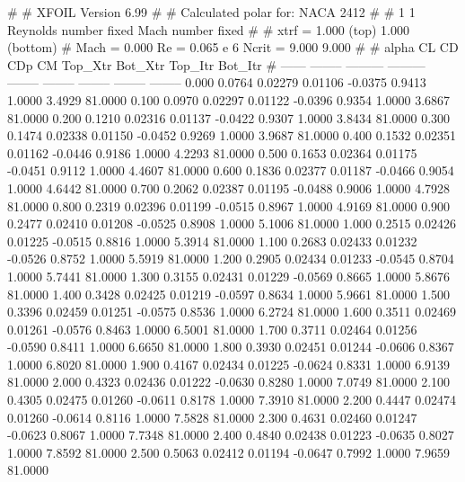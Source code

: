 #  
#       XFOIL         Version 6.99
#  
# Calculated polar for: NACA 2412                                       
#  
# 1 1 Reynolds number fixed          Mach number fixed         
#  
# xtrf =   1.000 (top)        1.000 (bottom)  
# Mach =   0.000     Re =     0.065 e 6     Ncrit =   9.000  9.000
#  
#   alpha    CL        CD       CDp       CM     Top_Xtr  Bot_Xtr  Top_Itr  Bot_Itr
#  ------ -------- --------- --------- -------- -------- -------- -------- --------
   0.000   0.0764   0.02279   0.01106  -0.0375   0.9413   1.0000   3.4929  81.0000
   0.100   0.0970   0.02297   0.01122  -0.0396   0.9354   1.0000   3.6867  81.0000
   0.200   0.1210   0.02316   0.01137  -0.0422   0.9307   1.0000   3.8434  81.0000
   0.300   0.1474   0.02338   0.01150  -0.0452   0.9269   1.0000   3.9687  81.0000
   0.400   0.1532   0.02351   0.01162  -0.0446   0.9186   1.0000   4.2293  81.0000
   0.500   0.1653   0.02364   0.01175  -0.0451   0.9112   1.0000   4.4607  81.0000
   0.600   0.1836   0.02377   0.01187  -0.0466   0.9054   1.0000   4.6442  81.0000
   0.700   0.2062   0.02387   0.01195  -0.0488   0.9006   1.0000   4.7928  81.0000
   0.800   0.2319   0.02396   0.01199  -0.0515   0.8967   1.0000   4.9169  81.0000
   0.900   0.2477   0.02410   0.01208  -0.0525   0.8908   1.0000   5.1006  81.0000
   1.000   0.2515   0.02426   0.01225  -0.0515   0.8816   1.0000   5.3914  81.0000
   1.100   0.2683   0.02433   0.01232  -0.0526   0.8752   1.0000   5.5919  81.0000
   1.200   0.2905   0.02434   0.01233  -0.0545   0.8704   1.0000   5.7441  81.0000
   1.300   0.3155   0.02431   0.01229  -0.0569   0.8665   1.0000   5.8676  81.0000
   1.400   0.3428   0.02425   0.01219  -0.0597   0.8634   1.0000   5.9661  81.0000
   1.500   0.3396   0.02459   0.01251  -0.0575   0.8536   1.0000   6.2724  81.0000
   1.600   0.3511   0.02469   0.01261  -0.0576   0.8463   1.0000   6.5001  81.0000
   1.700   0.3711   0.02464   0.01256  -0.0590   0.8411   1.0000   6.6650  81.0000
   1.800   0.3930   0.02451   0.01244  -0.0606   0.8367   1.0000   6.8020  81.0000
   1.900   0.4167   0.02434   0.01225  -0.0624   0.8331   1.0000   6.9139  81.0000
   2.000   0.4323   0.02436   0.01222  -0.0630   0.8280   1.0000   7.0749  81.0000
   2.100   0.4305   0.02475   0.01260  -0.0611   0.8178   1.0000   7.3910  81.0000
   2.200   0.4447   0.02474   0.01260  -0.0614   0.8116   1.0000   7.5828  81.0000
   2.300   0.4631   0.02460   0.01247  -0.0623   0.8067   1.0000   7.7348  81.0000
   2.400   0.4840   0.02438   0.01223  -0.0635   0.8027   1.0000   7.8592  81.0000
   2.500   0.5063   0.02412   0.01194  -0.0647   0.7992   1.0000   7.9659  81.0000
